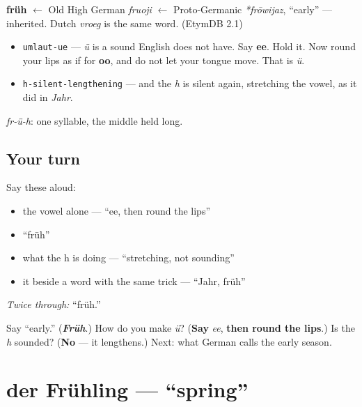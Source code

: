\begin{cousinweb}
\textbf{früh} $\leftarrow$ Old High German \emph{fruoji} $\leftarrow$ Proto-Germanic \emph{*frōwijaz}, \textquotedblleft{}early\textquotedblright{} — inherited. Dutch \emph{vroeg} is the same word. (EtymDB 2.1)
\end{cousinweb}

\begin{sounds}
\begin{itemize}
\raggedright
  \item \texttt{umlaut-ue} — \emph{ü} is a sound English does not have. Say \textbf{ee}. Hold it. Now round your lips as if for \textbf{oo}, and do not let your tongue move. That is \emph{ü}.
  \item \texttt{h-silent-lengthening} — and the \emph{h} is silent again, stretching the vowel, as it did in \emph{Jahr}.
\end{itemize}

\emph{fr-ü-h}: one syllable, the middle held long.
\end{sounds}

\subsection*{Your turn}
Say these aloud:

\begin{itemize}
\raggedright
  \item the vowel alone — \textquotedblleft{}ee, then round the lips\textquotedblright{}
  \item \textquotedblleft{}früh\textquotedblright{}
  \item what the h is doing — \textquotedblleft{}stretching, not sounding\textquotedblright{}
  \item it beside a word with the same trick — \textquotedblleft{}Jahr, früh\textquotedblright{}
\end{itemize}

\emph{Twice through:} \textquotedblleft{}früh.\textquotedblright{}

\begin{tcolorbox}[breakable,colback=teal!4,colframe=teal!35!black,title={Before you move on}]
Say \textquotedblleft{}early.\textquotedblright{} (\emph{\textbf{Früh}}.) How do you make \emph{ü}? (\textbf{Say} \emph{ee}, \textbf{then round the lips}.) Is the \emph{h} sounded? (\textbf{No} — it lengthens.) Next: what German calls the early season.
\end{tcolorbox}
\section[der Frühling]{der Frühling — \textquotedblleft{}spring\textquotedblright{}}

